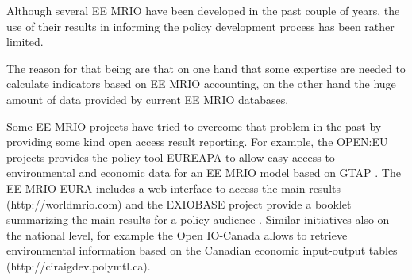 Although several EE MRIO have been developed in the past couple of years, the use of their results in informing the policy development process has been rather limited. 

The reason for that being are that on one hand that some expertise are needed to calculate indicators based on EE MRIO accounting, on the other hand the huge amount of data provided by current EE MRIO databases.

Some EE MRIO projects have tried to overcome that problem in the past by providing some kind open access result reporting. For example, the OPEN:EU projects provides the policy tool EUREAPA to allow easy access to environmental and economic data for an EE MRIO model based on GTAP \cite{Roelich_2014}. The EE MRIO EURA \cite{Lenzen_2013} includes a web-interface to access the main results (http://worldmrio.com) and the EXIOBASE project provide a booklet summarizing the main results for a policy audience \cite{tukker_global_2014}. Similar initiatives also on the national level, for example the Open IO-Canada allows to retrieve environmental information based on the Canadian economic input-output tables (http://ciraigdev.polymtl.ca).

